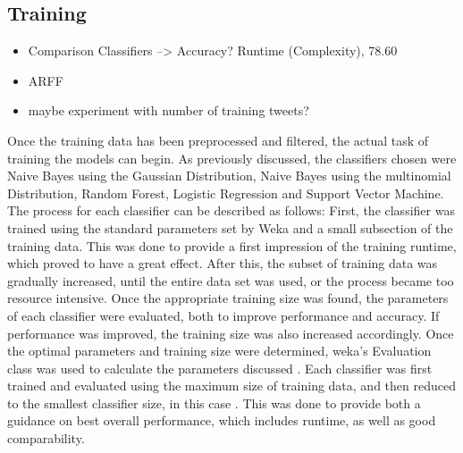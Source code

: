 \subsection{Training}
\begin{itemize}
    \item Comparison Classifiers --> Accuracy? Runtime (Complexity), 78.60
    \item ARFF
    \item maybe experiment with number of training tweets?
    \end{itemize}

Once the training data has been preprocessed and filtered, the actual task of training the models can begin. As previously discussed, the classifiers chosen were Naive Bayes using the Gaussian Distribution, Naive Bayes using the multinomial Distribution, Random Forest, Logistic Regression and Support Vector Machine. The process for each classifier can be described as follows: First, the classifier was trained using the standard parameters set by Weka and a small subsection of the training data. This was done to provide a first impression of the training runtime, which proved to have a great effect. After this, the subset of training data was gradually increased, until the entire data set was used, or the process became too resource intensive. Once the appropriate training size was found, the parameters of each classifier were evaluated, both to improve performance and accuracy. If performance was improved, the training size was also increased accordingly. Once the optimal parameters and training size were determined, weka's Evaluation class was used to calculate the parameters discussed \cite{weka}. Each classifier was first trained and evaluated using the maximum size of training data, and then reduced to the smallest classifier size, in this case . This was done to provide both a guidance on best overall performance, which includes runtime, as well as good comparability.

